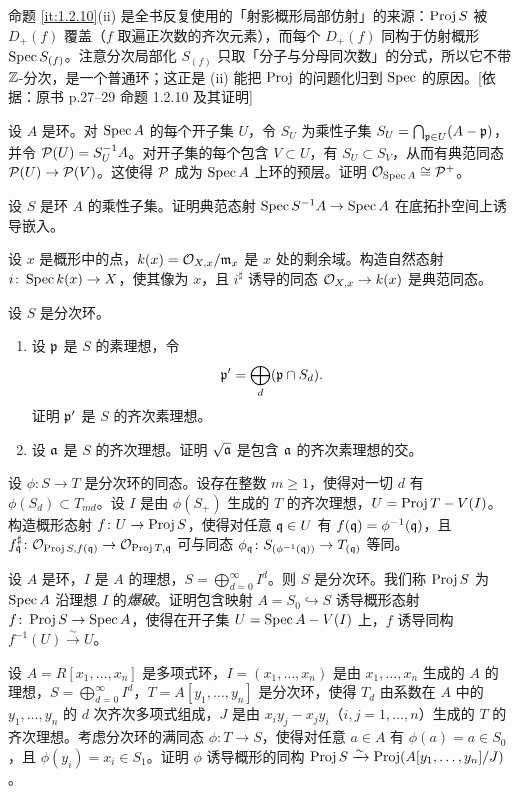 \begin{tnote}
命题 \ref{it:1.2.10}(ii) 是全书反复使用的「射影概形局部仿射」的来源：$\operatorname{Proj} S$ 被 $D_+(f)$ 覆盖（$f$ 取遍正次数的齐次元素），而每个 $D_+(f)$ 同构于仿射概形 $\operatorname{Spec} S_{(f)}$。注意分次局部化 $S_{(f)}$ 只取「分子与分母同次数」的分式，所以它不带 $\mathbb{Z}$-分次，是一个普通环；这正是 (ii) 能把 $\operatorname{Proj}$ 的问题化归到 $\operatorname{Spec}$ 的原因。[依据：原书 p.27–29 命题 1.2.10 及其证明]
\end{tnote}

\begin{exercises}
\item \label{ex:1.2.1} 设 $A$ 是环。对 $\operatorname{Spec} A$ 的每个开子集 $U$，令 $S_U$ 为乘性子集 $S_U=\bigcap_{\mathfrak{p}\in U}(A-\mathfrak{p})$，并令 $\mathcal{P}(U)=S_U^{-1}A$。对开子集的每个包含 $V\subset U$，有 $S_U\subset S_V$，从而有典范同态 $\mathcal{P}(U)\to\mathcal{P}(V)$。这使得 $\mathcal{P}$ 成为 $\operatorname{Spec} A$ 上环的预层。证明 $\mathcal{O}_{\operatorname{Spec} A}\cong\mathcal{P}^+$。
\item \label{ex:1.2.2} 设 $S$ 是环 $A$ 的乘性子集。证明典范态射 $\operatorname{Spec} S^{-1}A\to\operatorname{Spec} A$ 在底拓扑空间上诱导嵌入。
\item \label{ex:1.2.3} 设 $x$ 是概形中的点，$k(x)=\mathcal{O}_{X,x}/\mathfrak{m}_x$ 是 $x$ 处的剩余域。构造自然态射 $i\colon\operatorname{Spec} k(x)\to X$，使其像为 $x$，且 $i^\sharp$ 诱导的同态 $\mathcal{O}_{X,x}\to k(x)$ 是典范同态。
\item \label{ex:1.2.4} 设 $S$ 是分次环。
\begin{enumerate}[label=(\roman*)]
  \item 设 $\mathfrak{p}$ 是 $S$ 的素理想，令
  \[
  \mathfrak{p}'=\bigoplus_d(\mathfrak{p}\cap S_d).
  \]
  证明 $\mathfrak{p}'$ 是 $S$ 的齐次素理想。
  \item 设 $\mathfrak{a}$ 是 $S$ 的齐次理想。证明 $\sqrt{\mathfrak{a}}$ 是包含 $\mathfrak{a}$ 的齐次素理想的交。
\end{enumerate}
\item \label{ex:1.2.5} 设 $\phi\colon S\to T$ 是分次环的同态。设存在整数 $m\ge1$，使得对一切 $d$ 有 $\phi(S_d)\subset T_{md}$。设 $I$ 是由 $\phi(S_+)$ 生成的 $T$ 的齐次理想，$U=\operatorname{Proj} T-V(I)$。构造概形态射 $f\colon U\to\operatorname{Proj} S$，使得对任意 $\mathfrak{q}\in U$ 有 $f(\mathfrak{q})=\phi^{-1}(\mathfrak{q})$，且 $f^\sharp_{\mathfrak{q}}\colon\mathcal{O}_{\operatorname{Proj} S,f(\mathfrak{q})}\to\mathcal{O}_{\operatorname{Proj} T,\mathfrak{q}}$ 可与同态 $\phi_{\mathfrak{q}}\colon S_{(\phi^{-1}(\mathfrak{q}))}\to T_{(\mathfrak{q})}$ 等同。
\item \label{ex:1.2.6} 设 $A$ 是环，$I$ 是 $A$ 的理想，$S=\bigoplus_{d=0}^{\infty}I^d$。则 $S$ 是分次环。我们称 $\operatorname{Proj} S$ 为 $\operatorname{Spec} A$ 沿理想 $I$ 的\emph{爆破}。证明包含映射 $A=S_0\hookrightarrow S$ 诱导概形态射 $f\colon\operatorname{Proj} S\to\operatorname{Spec} A$，使得在开子集 $U=\operatorname{Spec} A-V(I)$ 上，$f$ 诱导同构 $f^{-1}(U)\xrightarrow{\sim}U$。
\item \label{ex:1.2.7} 设 $A=R[x_1,\dots,x_n]$ 是多项式环，$I=(x_1,\dots,x_n)$ 是由 $x_1,\dots,x_n$ 生成的 $A$ 的理想，$S=\bigoplus_{d=0}^{\infty}I^d$，$T=A[y_1,\dots,y_n]$ 是分次环，使得 $T_d$ 由系数在 $A$ 中的 $y_1,\dots,y_n$ 的 $d$ 次齐次多项式组成，$J$ 是由 $x_iy_j-x_jy_i$（$i,j=1,\dots,n$）生成的 $T$ 的齐次理想。考虑分次环的满同态 $\phi\colon T\to S$，使得对任意 $a\in A$ 有 $\phi(a)=a\in S_0$，且 $\phi(y_i)=x_i\in S_1$。证明 $\phi$ 诱导概形的同构 $\operatorname{Proj} S\xrightarrow{\sim}\operatorname{Proj}(A[y_1,\dots,y_n]/J)$。
\end{exercises}
